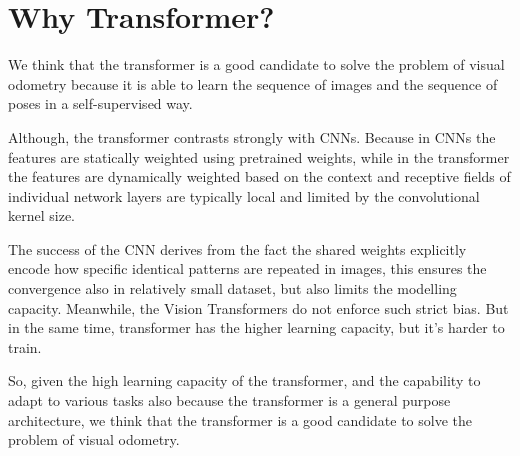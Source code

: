 \section{Why Transformer?}\label{sec:why-transformer}

We think that the transformer is a good candidate to solve the problem of visual odometry because it is able to learn the sequence of images and the sequence of poses in a self-supervised way.

Although, the transformer contrasts strongly with CNNs.
Because in CNNs the features are statically weighted using pretrained weights, while in the transformer the features are dynamically weighted based on the context and receptive fields of individual network layers are typically local and limited by the convolutional kernel size.

The success of the CNN derives from the fact the shared weights explicitly encode how specific identical patterns are repeated in images, this ensures the convergence also in relatively small dataset, but also limits the modelling capacity.
Meanwhile, the Vision Transformers do not enforce such strict bias.
But in the same time, transformer has the higher learning capacity, but it's harder to train.

So, given the high learning capacity of the transformer, and the capability to adapt to various tasks also because the transformer is a general purpose architecture, we think that the transformer is a good candidate to solve the problem of visual odometry.



